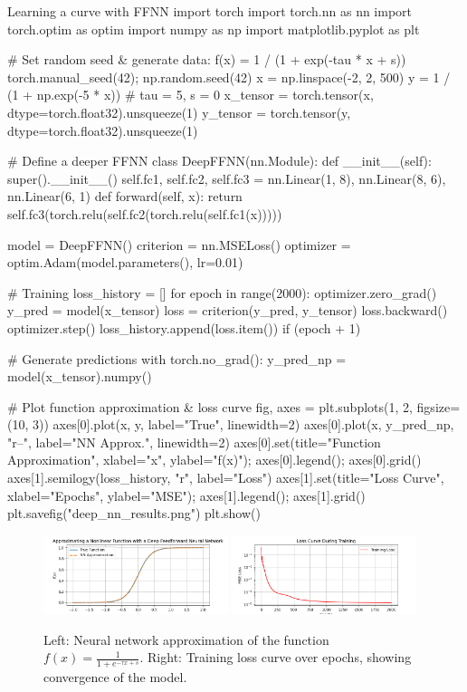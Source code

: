 \begin{codeonly}{Learning a curve with FFNN}
import torch
import torch.nn as nn
import torch.optim as optim
import numpy as np
import matplotlib.pyplot as plt

# Set random seed & generate data: f(x) = 1 / (1 + exp(-tau * x + s))
torch.manual_seed(42); np.random.seed(42)
x = np.linspace(-2, 2, 500)
y = 1 / (1 + np.exp(-5 * x))  # tau = 5, s = 0
x_tensor = torch.tensor(x, dtype=torch.float32).unsqueeze(1)
y_tensor = torch.tensor(y, dtype=torch.float32).unsqueeze(1)

# Define a deeper FFNN
class DeepFFNN(nn.Module):
    def __init__(self):
        super().__init__()
        self.fc1, self.fc2, self.fc3 = nn.Linear(1, 8), nn.Linear(8, 6), nn.Linear(6, 1)
    def forward(self, x): return self.fc3(torch.relu(self.fc2(torch.relu(self.fc1(x)))))

model = DeepFFNN()
criterion = nn.MSELoss()
optimizer = optim.Adam(model.parameters(), lr=0.01)

# Training
loss_history = []
for epoch in range(2000):
    optimizer.zero_grad()
    y_pred = model(x_tensor)
    loss = criterion(y_pred, y_tensor)
    loss.backward()
    optimizer.step()
    loss_history.append(loss.item())
    if (epoch + 1) %

# Generate predictions
with torch.no_grad(): y_pred_np = model(x_tensor).numpy()

# Plot function approximation & loss curve
fig, axes = plt.subplots(1, 2, figsize=(10, 3))
axes[0].plot(x, y, label="True", linewidth=2)
axes[0].plot(x, y_pred_np, "r--", label="NN Approx.", linewidth=2)
axes[0].set(title="Function Approximation", xlabel="x", ylabel="f(x)"); axes[0].legend(); axes[0].grid()
axes[1].semilogy(loss_history, "r", label="Loss")
axes[1].set(title="Loss Curve", xlabel="Epochs", ylabel="MSE"); axes[1].legend(); axes[1].grid()
plt.savefig("deep_nn_results.png")
plt.show()
\end{codeonly}

\begin{figure}[ht]
    \centering
    \includegraphics[width=0.48\textwidth]{images/deep_nn_function_approximation.png}
    \includegraphics[width=0.48\textwidth]{images/deep_nn_loss_curve.png}
    \caption{Left: Neural network approximation of the function \( f(x) = \frac{1}{1 + e^{-\tau x + s}} \). 
    Right: Training loss curve over epochs, showing convergence of the model.}
    \label{fig:nn_function_loss}
\end{figure}

